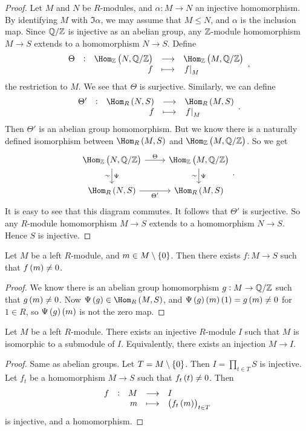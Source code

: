 \begin{proof}
Let $ M $ and $ N $ be $ R $-modules, and $ \alpha : M \to N $ an injective homomorphism. By identifying $ M $ with $ \Im \alpha $, we may assume that $ M \le N $, and $ \alpha $ is the inclusion map. Since $ \mathbb{Q} / \mathbb{Z} $ is injective as an abelian group, any $ \mathbb{Z} $-module homomorphism $ M \to S $ extends to a homomorphism $ N \to S $. Define
$$ \function[\Theta]{\Hom_\ZZ\br{N, \QQ / \ZZ}}{\Hom_\ZZ\br{M, \QQ / \ZZ}}{f}{\eval{f}_M}, $$
the restriction to $ M $. We see that $ \Theta $ is surjective. Similarly, we can define
$$ \function[\Theta']{\Hom_R\br{N, S}}{\Hom_R\br{M, S}}{f}{\eval{f}_M}. $$
Then $ \Theta' $ is an abelian group homomorphism. But we know there is a naturally defined isomorphism between $ \Hom_R\br{M, S} $ and $ \Hom_\ZZ\br{M, \QQ / \ZZ} $. So we get
$$
\begin{tikzcd}
\Hom_\ZZ\br{N, \QQ / \ZZ} \arrow{r}{\Theta} \arrow{d}{\Psi}[swap]{\sim} & \Hom_\ZZ\br{M, \QQ / \ZZ} \arrow{d}{\Psi}[swap]{\sim} \\
\Hom_R\br{N, S} \arrow[swap]{r}{\Theta'} & \Hom_R\br{M, S}
\end{tikzcd}.
$$
It is easy to see that this diagram commutes. It follows that $ \Theta' $ is surjective. So any $ R $-module homomorphism $ M \to S $ extends to a homomorphism $ N \to S $. Hence $ S $ is injective.
\end{proof}

\pagebreak

\begin{proposition}
Let $ M $ be a left $ R $-module, and $ m \in M \setminus \cbr{0} $. Then there exists $ f : M \to S $ such that $ f\br{m} \ne 0 $.
\end{proposition}

\begin{proof}
We know there is an abelian group homomorphism $ g : M \to \mathbb{Q} / \mathbb{Z} $ such that $ g\br{m} \ne 0 $. Now $ \Psi\br{g} \in \Hom_R\br{M, S} $, and $ \Psi\br{g}\br{m}\br{1} = g\br{m} \ne 0 $ for $ 1 \in R $, so $ \Psi\br{g}\br{m} $ is not the zero map.
\end{proof}

\begin{proposition}
Let $ M $ be a left $ R $-module. There exists an injective $ R $-module $ I $ such that $ M $ is isomorphic to a submodule of $ I $. Equivalently, there exists an injection $ M \to I $.
\end{proposition}

\begin{proof}
Same as abelian groups. Let $ T = M \setminus \cbr{0} $. Then $ I = \prod_{t \in T} S $ is injective. Let $ f_t $ be a homomorphism $ M \to S $ such that $ f_t\br{t} \ne 0 $. Then
$$ \function[f]{M}{I}{m}{\br{f_t\br{m}}_{t \in T}} $$
is injective, and a homomorphism.
\end{proof}

